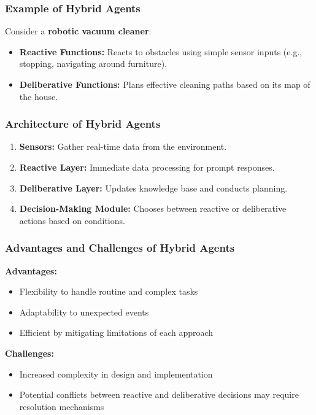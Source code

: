 \documentclass[aspectratio=169]{beamer}
\begin{document}
\begin{frame}[fragile]
    \frametitle{Example of Hybrid Agents}
    Consider a \textbf{robotic vacuum cleaner}:
    \begin{itemize}
        \item \textbf{Reactive Functions:} Reacts to obstacles using simple sensor inputs (e.g., stopping, navigating around furniture).
        \item \textbf{Deliberative Functions:} Plans effective cleaning paths based on its map of the house.
    \end{itemize}
\end{frame}

\begin{frame}[fragile]
    \frametitle{Architecture of Hybrid Agents}
    \begin{enumerate}
        \item \textbf{Sensors:} Gather real-time data from the environment.
        \item \textbf{Reactive Layer:} Immediate data processing for prompt responses.
        \item \textbf{Deliberative Layer:} Updates knowledge base and conducts planning.
        \item \textbf{Decision-Making Module:} Chooses between reactive or deliberative actions based on conditions.
    \end{enumerate}
\end{frame}

\begin{frame}[fragile]
    \frametitle{Advantages and Challenges of Hybrid Agents}
    \textbf{Advantages:}
    \begin{itemize}
        \item Flexibility to handle routine and complex tasks
        \item Adaptability to unexpected events
        \item Efficient by mitigating limitations of each approach
    \end{itemize}

    \textbf{Challenges:}
    \begin{itemize}
        \item Increased complexity in design and implementation
        \item Potential conflicts between reactive and deliberative decisions may require resolution mechanisms
    \end{itemize}
\end{frame}
\end{document}
